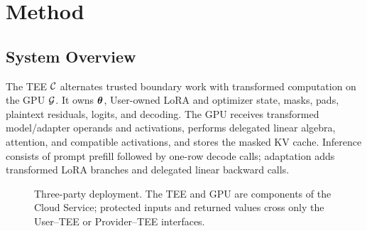 \newenvironment{methodalgorithm}[1]{%
  \par\medskip\refstepcounter{methodalgorithm}%
  \small\hrule\vspace{3pt}%
  \noindent\textbf{Algorithm \themethodalgorithm: #1}\par\vspace{3pt}
}{\vspace{3pt}\hrule\par\medskip}

\section{Method}
\label{sec:method}

\subsection{System Overview}
\label{subsec:method-overview}

The TEE $\mathcal{C}$ alternates trusted boundary work with transformed computation
on the GPU $\mathcal{G}$. It owns $\boldsymbol{\theta}$, User-owned LoRA and optimizer state,
masks, pads, plaintext residuals, logits, and decoding. The GPU receives
transformed model/adapter operands and activations, performs delegated linear
algebra, attention, and compatible activations, and stores the masked KV cache.
Inference consists of prompt prefill followed by one-row decode calls;
adaptation adds transformed LoRA branches and delegated linear backward calls.

\begin{figure}[t]
\centering
{}
\caption{Three-party deployment. The TEE and GPU are components of the Cloud
Service; protected inputs and returned values cross only the User--TEE or
Provider--TEE interfaces.}
\label{fig:method-overview}
\end{figure}

